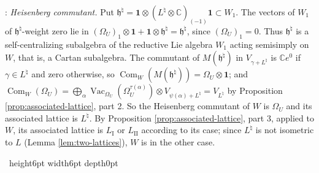 \documentclass[leqno]{article}
\newcommand{\Cbb}{\ensuremath{\mathbb{C}}}
\newcommand{\qed}{\hfill \vrule height6pt  width6pt depth0pt}
\newcommand{\ot}{\otimes}
\newenvironment{proof}[1][]{\noindent {\it Proof #1} : }{\hbox{~}\qed
\smallskip
}
\numberwithin{equation}{section}
\begin{document}
\begin{proof}
\emph{Heisenberg commutant.} Put $\mathfrak h^\natural = \mathbf 1 \ot (L^\natural \ot \Cbb)_{(-1)}\mathbf 1 \subset W_1$. The vectors of $W_1$ of $\mathfrak h^\natural$-weight zero lie in $(\Omega_U)_1 \ot \mathbf 1+\mathbf 1 \ot \mathfrak h^\natural = \mathfrak h^\natural$, since $(\Omega_U)_1 = 0$. Thus $\mathfrak h^\natural$ is a self-centralizing subalgebra of the reductive Lie algebra $W_1$ \cite{DoM04} acting semisimply on $W$, that is, a Cartan subalgebra. The commutant of $M(\mathfrak h^\natural)$ in $V_{\gamma+L^\natural}$ is $\Cbb e^0$ if $\gamma \in L^\natural$ and zero otherwise, so $\operatorname{Com}_W(M(\mathfrak h^\natural)) = \Omega_U \ot \mathbf 1$; and $\operatorname{Com}_W(\Omega_U) = \bigoplus_\alpha \operatorname{Vac}_{\Omega_U}(\Omega_U^{\tau(\alpha)}) \ot V_{\psi(\alpha)+L^\natural} = V_{L^\natural}$ by Proposition \ref{prop:associated-lattice}, part 2. So the Heisenberg commutant of $W$ is $\Omega_U$ and its associated lattice is $L^\natural$. By Proposition \ref{prop:associated-lattice}, part 3, applied to $W$, its associated lattice is $L_{\mathrm I}$ or $L_{\mathrm{II}}$ according to its case; since $L^\natural$ is not isometric to $L$ (Lemma \ref{lem:two-lattices}), $W$ is in the other case.


\end{proof}
\end{document}
